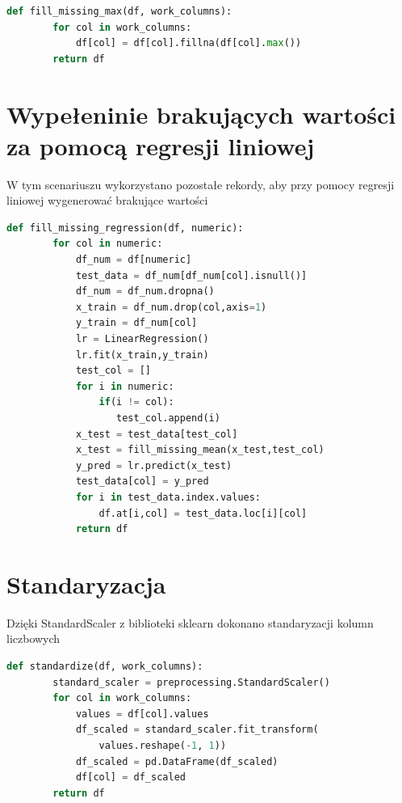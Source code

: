 \documentclass{book}
\begin{document}
\begin{lstlisting}[language=Python, caption={Wypełnienie 
    brakujących wartości maksimum}, captionpos=b]
    def fill_missing_max(df, work_columns):
        for col in work_columns:
            df[col] = df[col].fillna(df[col].max())
        return df
\end{lstlisting}

\section{Wypełeninie brakujących wartości za pomocą regresji liniowej}
W tym scenariuszu wykorzystano pozostałe rekordy, 
aby przy pomocy regresji liniowej wygenerować 
brakujące wartości

\begin{lstlisting}[language=Python, caption={Wypełnienie 
    brakujących wartości za pomocą regresji liniowej}, captionpos=b]
    def fill_missing_regression(df, numeric):    
        for col in numeric:
            df_num = df[numeric]
            test_data = df_num[df_num[col].isnull()]
            df_num = df_num.dropna()
            x_train = df_num.drop(col,axis=1)
            y_train = df_num[col]
            lr = LinearRegression()
            lr.fit(x_train,y_train)
            test_col = []
            for i in numeric:
                if(i != col):
                   test_col.append(i)
            x_test = test_data[test_col]
            x_test = fill_missing_mean(x_test,test_col)
            y_pred = lr.predict(x_test)
            test_data[col] = y_pred
            for i in test_data.index.values:
                df.at[i,col] = test_data.loc[i][col]
            return df
\end{lstlisting}

\section{Standaryzacja}
Dzięki StandardScaler z biblioteki sklearn dokonano 
standaryzacji kolumn liczbowych

\begin{lstlisting}[language=Python, caption={Standaryzacja 
    kolumn liczbowych}, captionpos=b]
    def standardize(df, work_columns):
        standard_scaler = preprocessing.StandardScaler()
        for col in work_columns:
            values = df[col].values
            df_scaled = standard_scaler.fit_transform(
                values.reshape(-1, 1)) 
            df_scaled = pd.DataFrame(df_scaled)
            df[col] = df_scaled
        return df
\end{lstlisting}
\end{document}
